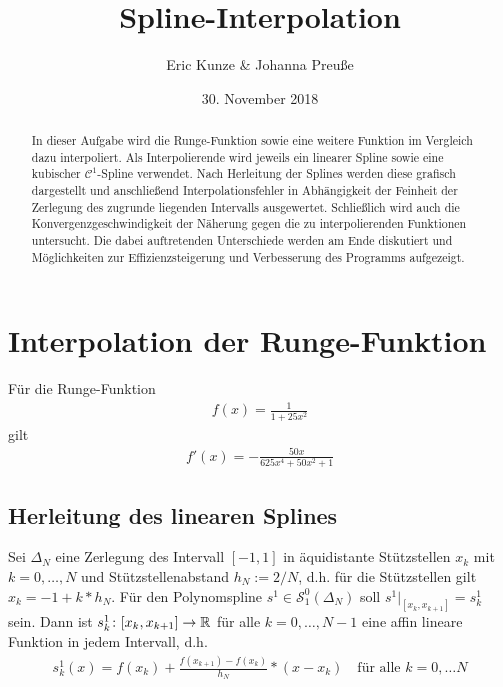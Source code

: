 \documentclass[a4paper, 11pt, ngerman]{scrartcl}
\title{Spline-Interpolation}
\author{Eric Kunze \& Johanna Preuße}
\date{30. November 2018}
\begin{document}
\maketitle

\begin{abstract}
	In dieser Aufgabe wird die Runge-Funktion sowie eine weitere Funktion im Vergleich dazu interpoliert. Als Interpolierende wird jeweils ein linearer Spline sowie eine kubischer $\mathcal{C}^1$-Spline verwendet. Nach Herleitung der Splines werden diese grafisch dargestellt und anschließend Interpolationsfehler in Abhängigkeit der Feinheit der Zerlegung des zugrunde liegenden Intervalls ausgewertet. Schließlich wird auch die Konvergenzgeschwindigkeit der Näherung gegen die zu interpolierenden Funktionen untersucht. Die dabei auftretenden Unterschiede werden am Ende diskutiert und Möglichkeiten zur Effizienzsteigerung und Verbesserung des Programms aufgezeigt.
\end{abstract}

\tableofcontents
\pagebreak

\section{Interpolation der Runge-Funktion}

Für die Runge-Funktion
\begin{align*}
	f(x) = \frac{1}{1+25x^2}
\end{align*}
gilt
\begin{align*}
	f'(x) = - \frac{50x}{625x^4+50x^2+1}
\end{align*}

\subsection{Herleitung des linearen Splines}
\label{sec: herlinspline}

Sei $\Delta_N$ eine Zerlegung des Intervall $[-1,1]$ in äquidistante Stützstellen $x_k$ mit $k=0, \dots, N$ und Stützstellenabstand $h_N := 2 / N$, d.h. für die Stützstellen gilt $x_k = -1 + k * h_N$. Für den Polynomspline $ s^1 \in \mathcal{S}_1^0(\Delta_N)$ soll $s^1 \vert_{[x_k , x_{k+1}]} = s_k^1$ sein. Dann ist $s_k^1 \colon [x_k, x_{k+1}] \to \mathbb{R}$ für alle $k = 0, \dots , N-1$ eine affin lineare Funktion in jedem Intervall, d.h. 
\begin{align*}
	s_k^1(x) = f(x_k) + \frac{f(x_{k+1})- f(x_k)}{h_N} * (x - x_k) \quad \text{für alle } k = 0, \dots N
\end{align*}
\end{document}
